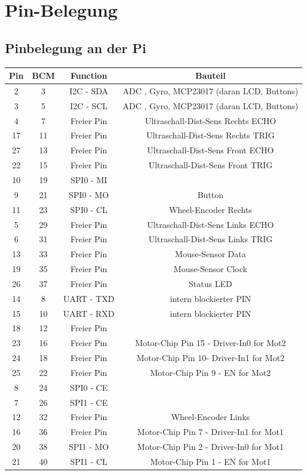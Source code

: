 \documentclass[twoside,11pt, a4paper]{report}
\begin{document}
	\chapter{Pin-Belegung}
	\section{Pinbelegung an der Pi}
	
	\begin{center}
		\begin{tabular}{|cc|c|c|}
			\hline
			Pin 	&BCM		& Function 		& Bauteil\\
			\hline
			2		&3			& I2C - SDA		& ADC , Gyro, MCP23017 (daran LCD, Buttons) \\
			3 		&5			& I2C - SCL		& ADC , Gyro, MCP23017 (daran LCD, Buttons)\\
			4		&7			& Freier Pin	& Ultraschall-Dist-Sens Rechts ECHO\\
			17		&11 		& Freier Pin	& Ultraschall-Dist-Sens Rechts TRIG	\\
			27		&13 		& Freier Pin	& Ultraschall-Dist-Sens Front ECHO	\\
			22		&15 		& Freier Pin	& Ultraschall-Dist-Sens Front TRIG	\\
			10		&19 		& SPI0 - MI		& 	\\
			9		&21 		& SPI0 - MO		& Button		\\
			11		&23 		& SPI0 - CL		& Wheel-Encoder Rechts		\\
			5		&29 		& Freier Pin	& Ultraschall-Dist-Sens Links ECHO		\\
			6		&31 		& Freier Pin	& Ultraschall-Dist-Sens Links TRIG	\\
			13		&33 		& Freier Pin	& Mouse-Sensor Data	\\	
			19		&35 		& Freier Pin	& Mouse-Sensor Clock	\\
			26		&37 		& Freier Pin	& Status LED\\
			14		&8 			& UART - TXD	& 	intern blockierter PIN\\
			15		&10 		& UART - RXD	&  	intern blockierter PIN\\
			18		&12 		& Freier Pin	& 	\\
			23 		&16 		& Freier Pin	& Motor-Chip Pin 15 - Driver-In0 for Mot2	\\
			24		&18 		& Freier Pin	& Motor-Chip Pin 10- Driver-In1 for Mot2	\\
			25		&22 		& Freier Pin	& Motor-Chip Pin 9 - EN for Mot2	\\
			8		&24 		& SPI0 - CE		& 	\\
			7		&26 		& SPI1 - CE		&  	\\
			12		&32 		& Freier Pin	& Wheel-Encoder Links	\\
			16		&36 		& Freier Pin	& Motor-Chip Pin 7 - Driver-In1 for Mot1	\\
			20		&38 		& SPI1 - MO		& Motor-Chip Pin 2 - Driver-In0 for Mot1		\\
			21		&40 		& SPI1	- CL	& Motor-Chip Pin 1 - EN for Mot1	\\
			\hline
		\end{tabular}
	\end{center}
\end{document}
